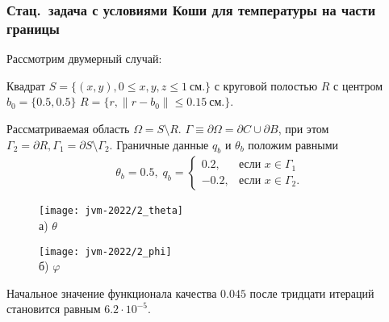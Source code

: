 
\begin{frame}
    \frametitle{Стац.\ задача с условиями Коши для температуры на части границы}
    Рассмотрим двумерный случай:

    Квадрат $S = \{(x, y), 0 \leq x,y,z \leq 1~\text{см.}\}$ с
    круговой полостью $R$ с центром $b_0 =\{0.5, 0.5\}$
    $R = \{r, \| r - b_0 \| \leq 0.15~\text{см.} \}$.

    Рассматриваемая область $\Omega = S \setminus R$.
    $\Gamma \equiv \partial \Omega = \partial C \cup \partial B$, при этом
    $ \Gamma_2 = \partial R, \Gamma_1 = \partial S \setminus \Gamma_2$.
    Граничные данные $q_b$ и $\theta_b$ положим равными
    \begin{gather*}
        \theta_b = 0.5, \;
        q_b =
        \begin{cases}
            0.2, & \text{если } x \in \Gamma_1 \\
            -0.2, & \text{если } x \in \Gamma_2.
        \end{cases}
    \end{gather*}
    \begin{figure}[h!t]
        \begin{minipage}[b][][b]{0.49\linewidth}
            \centering
            \texttt{[image: jvm-2022/2\_theta]}
            \\ а) $\theta$
        \end{minipage}
        \hfill
        \begin{minipage}[b][][b]{0.49\linewidth}
            \centering
            \texttt{[image: jvm-2022/2\_phi]}
            \\ б) $\varphi$
        \end{minipage}
        \label{fig:4_4:6}
    \end{figure}
    Начальное значение функционала качества $0.045$
    после тридцати итераций становится равным $6.2\cdot10^{-5}$.
\end{frame}
